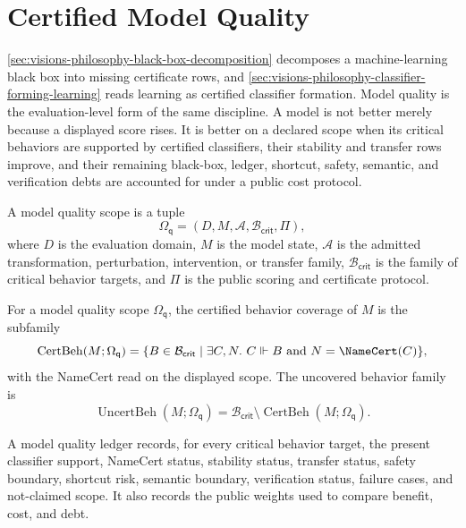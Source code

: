 \section{Certified Model Quality}
\label{sec:visions-philosophy-certified-model-quality}

\autoref{sec:visions-philosophy-black-box-decomposition} decomposes a
machine-learning black box into missing certificate rows, and
\autoref{sec:visions-philosophy-classifier-forming-learning} reads
learning as certified classifier formation. Model quality is the
evaluation-level form of the same discipline. A model is not better
merely because a displayed score rises. It is better on a declared scope
when its critical behaviors are supported by certified classifiers,
their stability and transfer rows improve, and their remaining
black-box, ledger, shortcut, safety, semantic, and verification debts are
accounted for under a public cost protocol.

\begin{definition}
\label{def:philosophy-model-quality-scope}
A model quality scope is a tuple
$$
\Omega_{\mathsf{q}}
=
(D,M,\mathcal A,\mathcal B_{\mathsf{crit}},\Pi),
$$
where $D$ is the evaluation domain, $M$ is the model state,
$\mathcal A$ is the admitted transformation, perturbation,
intervention, or transfer family, $\mathcal B_{\mathsf{crit}}$ is the
family of critical behavior targets, and $\Pi$ is the public scoring and
certificate protocol.
\end{definition}

\begin{definition}
\label{def:philosophy-certified-behavior-coverage}
For a model quality scope $\Omega_{\mathsf{q}}$, the certified behavior
coverage of $M$ is the subfamily
$$
\operatorname{CertBeh}(M;\Omega_{\mathsf{q}})
=
\{B\in\mathcal B_{\mathsf{crit}}\mid
\exists C,N.\ C\Vdash B\ \text{and}\ N=\NameCert(C)\},
$$
with the NameCert read on the displayed scope. The uncovered behavior
family is
$$
\operatorname{UncertBeh}(M;\Omega_{\mathsf{q}})
=
\mathcal B_{\mathsf{crit}}
\setminus
\operatorname{CertBeh}(M;\Omega_{\mathsf{q}}).
$$
\end{definition}

\begin{definition}
\label{def:philosophy-model-quality-ledger}
A model quality ledger records, for every critical behavior target, the
present classifier support, NameCert status, stability status, transfer
status, safety boundary, shortcut risk, semantic boundary, verification
status, failure cases, and not-claimed scope. It also records the public
weights used to compare benefit, cost, and debt.
\end{definition}

